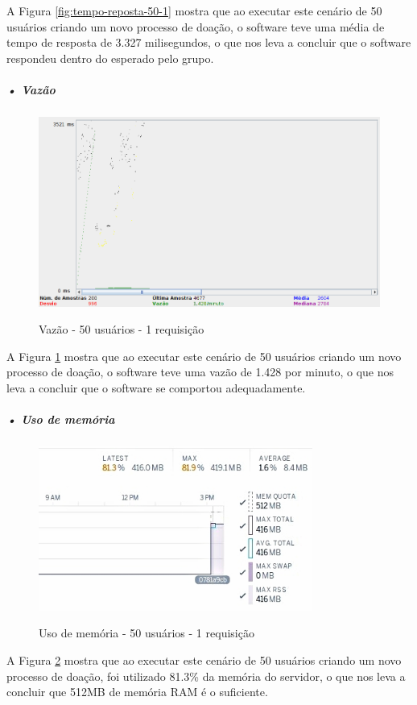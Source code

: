 \documentclass[portuguese,oneside]{tcc}
\begin{document}
A Figura \ref{fig:tempo-reposta-50-1} mostra que ao executar este cenário de 50 usuários criando um novo processo de doação, o software teve uma média de tempo de resposta de 3.327 milisegundos, o que nos leva a concluir que o software respondeu dentro do esperado pelo grupo.

\newpage

\subparagraph{• Vazão}
\begin{figure}[htp]
\centering
\caption{Vazão - 50 usuários - 1 requisição}
\includegraphics[width=15cm]{50-1-throughput}
\label{fig:throughput-50-1}
\end{figure}

A Figura \ref{fig:throughput-50-1} mostra que ao executar este cenário de 50 usuários criando um novo processo de doação, o software teve uma vazão de 1.428 por minuto, o que nos leva a concluir que o software se comportou adequadamente.

\subparagraph{• Uso de memória}
\begin{figure}[htp]
\centering
\caption{Uso de memória - 50 usuários - 1 requisição}
\includegraphics[width=9cm]{50-1-memory}
\label{fig:uso-de-memoria-50-1}
\end{figure}

A Figura \ref{fig:uso-de-memoria-50-1} mostra que ao executar este cenário de 50 usuários criando um novo processo de doação, foi utilizado 81.3\% da memória do servidor, o que nos leva a concluir que 512MB de memória RAM é o suficiente.
\end{document}

